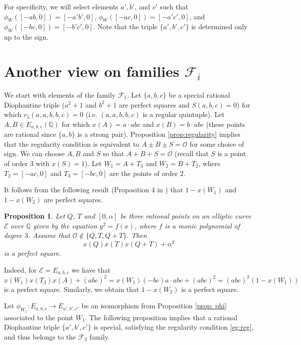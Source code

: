 \documentclass[a4paper]{amsart}
\theoremstyle{plain}
\newtheorem{proposition}[theorem]{Proposition}
\def\Q{\mathbb{Q}}
\theoremstyle{definition}
\begin{document}
For specificity, we will select elements $a', b'$, and $c'$ such that $\phi_W([-ab,0]) = [-a'b',0]$, $\phi_W([-ac,0]) = [-a'c',0]$, and $\phi_W([-bc,0]) = [-b'c',0]$. Note that the triple $\{a',b',c'\}$ is determined only up to the sign.

\section{Another view on families $\mathcal{F}_i$}
We start with elements of the family $\mathcal{F}_1$. Let $\{a,b,c\}$ be a special rational Diophantine triple ($a^2+1$ and $b^2+1$ are perfect squares and $S(a,b,c)=0$) for which $r_5(a,a,b,b,c)=0$ (i.e. $(a,a,b,b,c)$ is a regular quintuple). Let $A,B\in E_{a,b,c}(\Q)$ for which $x(A)=a \cdot abc$ and $x(B)=b\cdot abc$ (these points are rational since $\{a,b\}$ is a strong pair). Proposition \ref{prop:regularity} implies that the regularity condition is equivalent to $A\pm B \pm S=\mathcal{O}$ for some choice of sign. We can choose $A, B$ and $S$ so that $A+B+S=\mathcal{O}$ (recall that $S$ is a point of order $3$ with $x(S)=1$). Let $W_1=A+T_3$ and $W_2=B+T_2$, where $T_2=[-ac,0]$ and $T_3=[-bc,0]$ are the points of order $2$.

It follows from the following result (Proposition 4 in \cite{DKMS}) that $1-x(W_1)$ and $1-x(W_2)$ are perfect squares.

\begin{proposition}\label{prop:imrn}
	Let $Q$, $T$ and $[0,\alpha]$ be three rational points on an elliptic curve $\mathcal{E}$ over $\mathbb{Q}$
	given by the equation $y^2=f(x)$, where $f$ is a monic polynomial of degree $3$.
	Assume that $\mathcal{O} \not\in \{Q,T,Q+T\}$.
	Then
	$$ x(Q)x(T)x(Q+T)+ \alpha^2 $$
	is a perfect square.
\end{proposition}

Indeed, for $\mathcal{E}=E_{a,b,c}$ we have that $$x(W_1)x(T_3)x(A)+(abc)^2=x(W_1)(-bc)a\cdot abc+(abc)^2=(abc)^2(1-x(W_1))$$ is a perfect square. Similarly, we obtain that $1-x(W_2)$ is a perfect square.

Let $\phi_{W_1}:E_{a,b,c} \rightarrow E_{a',b',c'}$ be an isomorphism from Proposition \ref{prop: phi} associated to the point $W_1$.
The following proposition implies that a rational Diophantine triple $\{a',b',c'\}$ is special, satisfying the regularity condition \eqref{eg:reg}, and thus belongs to the $\mathcal{F}_2$ family.
\end{document}
